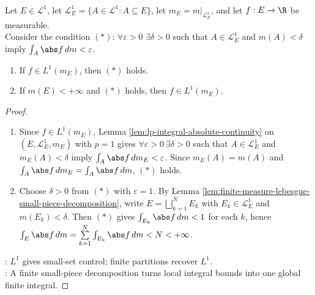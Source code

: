 \begin{proposition} \label{prop:l1-small-set-absolute-continuity-finite-lebesgue-converse} \\
Let $E\in\mathcal{L}^1$, let $\mathcal{L}^1_E=\{A\in\mathcal{L}^1:A\subseteq E\}$, let $m_E=m|_{\mathcal{L}^1_E}$, and let $f:E\to\R$ be measurable.\\
Consider the condition $(\ast)$: $\forall \varepsilon>0$ $\exists \delta>0$ such that $A\in\mathcal{L}^1_E$ and $m(A)<\delta$ imply $\int_A\abs f\,dm<\varepsilon$.
\begin{enumerate}[label=(\roman*)]
\setlength{\itemsep}{0pt}
\item If $f\in L^1(m_E)$, then $(\ast)$ holds.
\item If $m(E)<+\infty$ and $(\ast)$ holds, then $f\in L^1(m_E)$.
\end{enumerate}
\begin{proof}
\begin{enumerate}[label=(\roman*)]
\setlength{\itemsep}{0pt}
\item Since $f\in L^1(m_E)$, Lemma \ref{lem:lp-integral-absolute-continuity} on $(E,\mathcal{L}^1_E,m_E)$ with $p=1$ gives $\forall\varepsilon>0\ \exists\delta>0$ such that $A\in\mathcal{L}^1_E$ and $m_E(A)<\delta$ imply $\int_A\abs f\,dm_E<\varepsilon$. Since $m_E(A)=m(A)$ and $\int_A\abs f\,dm_E=\int_A\abs f\,dm$, $(\ast)$ holds.
\item Choose $\delta>0$ from $(\ast)$ with $\varepsilon=1$. By Lemma \ref{lem:finite-measure-lebesgue-small-piece-decomposition}, write $E=\bigsqcup\limits_{k=1}^{N}E_k$ with $E_k\in\mathcal{L}^1_E$ and $m(E_k)<\delta$. Then $(\ast)$ gives $\int_{E_k}\abs f\,dm<1$ for each $k$, hence $\int_E\abs f\,dm=\sum\limits_{k=1}^{N}\int_{E_k}\abs f\,dm<N<+\infty$.
\end{enumerate}
: $L^1$ gives small-set control; finite partitions recover $L^1$.\\
: A finite small-piece decomposition turns local integral bounds into one global finite integral.
\end{proof}
\end{proposition}

